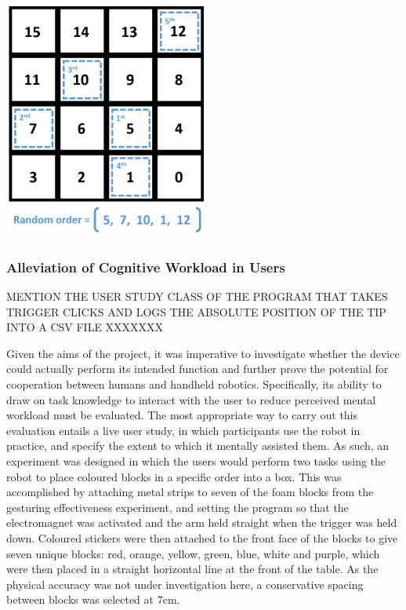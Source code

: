 \documentclass[11pt]{article}
\begin{document}
\begin{center}
\includegraphics[width=0.5\textwidth]{images/gridSequence.png}
\label{figure:gridSequence}
\end{center}



\subsubsection{Alleviation of Cognitive Workload in Users}
MENTION THE USER STUDY CLASS OF THE PROGRAM THAT TAKES TRIGGER CLICKS AND LOGS THE ABSOLUTE POSITION OF THE TIP INTO A CSV FILE XXXXXXX

Given the aims of the project, it was imperative to investigate whether the device could actually perform its intended function and further prove the potential for cooperation between humans and handheld robotics. Specifically, its ability to draw on task knowledge to interact with the user to reduce perceived mental workload must be evaluated. The most appropriate way to carry out this evaluation entails a live user study, in which participants use the robot in practice, and specify the extent to which it mentally assisted them. As such, an experiment was designed in which the users would perform two tasks using the robot to place coloured blocks in a specific order into a box. This was accomplished by attaching metal strips to seven of the foam blocks from the gesturing effectiveness experiment, and setting the program so that the electromagnet was activated and the arm held straight when the trigger was held down. Coloured stickers were then attached to the front face of the blocks to give seven unique blocks: red, orange, yellow, green, blue, white and purple, which were then placed in a straight horizontal line at the front of the table. As the physical accuracy was not under investigation here, a conservative spacing between blocks was selected at 7cm.
\end{document}
